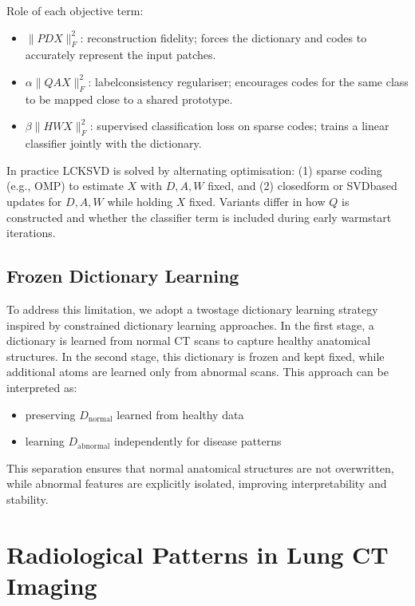 Role of each objective term:
\begin{itemize}
    \item $\|P  D X\|_F^2$: reconstruction fidelity; forces the dictionary and codes to accurately represent the input patches.
    \item $\alpha \|Q  A X\|_F^2$: labelconsistency regulariser; encourages codes for the same class to be mapped close to a shared prototype.
    \item $\beta \|H  W X\|_F^2$: supervised classification loss on sparse codes; trains a linear classifier jointly with the dictionary.
\end{itemize}

In practice LCKSVD is solved by alternating optimisation: (1) sparse coding (e.g., OMP) to estimate $X$ with $D,A,W$ fixed, and (2) closedform or SVDbased updates for $D,A,W$ while holding $X$ fixed. Variants differ in how $Q$ is constructed and whether the classifier term is included during early warmstart iterations.

\subsection{Frozen Dictionary Learning}

To address this limitation, we adopt a twostage dictionary learning strategy inspired by constrained dictionary learning approaches. \cite{yankelevsky2016frozen}
In the first stage, a dictionary is learned from normal CT scans to capture healthy anatomical structures.
In the second stage, this dictionary is frozen and kept fixed, while additional atoms are learned only from abnormal scans.
This approach can be interpreted as:

\begin{itemize}
    \item preserving $D_{\text{normal}}$ learned from healthy data
    \item learning $D_{\text{abnormal}}$ independently for disease patterns
\end{itemize}

This separation ensures that normal anatomical structures are not overwritten, while abnormal features are explicitly isolated,
improving interpretability and stability.

% 

\section{Radiological Patterns in Lung CT Imaging}

